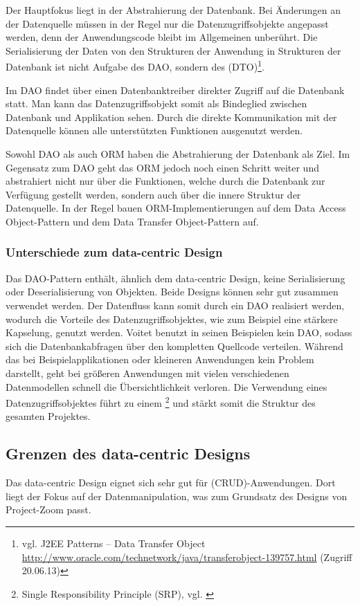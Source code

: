 Der Hauptfokus liegt in der Abstrahierung der Datenbank. Bei Änderungen an der Datenquelle müssen in der Regel nur die Datenzugriffsobjekte angepasst werden, denn der Anwendungscode bleibt im Allgemeinen unberührt. Die Serialisierung der Daten von den Strukturen der Anwendung in Strukturen der Datenbank ist nicht Aufgabe des DAO, sondern des  (DTO)\footnote{vgl. J2EE Patterns – Data Transfer Object \url{http://www.oracle.com/technetwork/java/transferobject-139757.html} (Zugriff 20.06.13)}.

Im DAO findet über einen Datenbanktreiber direkter Zugriff auf die Datenbank statt. Man kann das Datenzugriffsobjekt somit als Bindeglied zwischen Datenbank und Applikation sehen. Durch die direkte Kommunikation mit der Datenquelle können alle unterstützten Funktionen ausgenutzt werden. 

Sowohl DAO als auch ORM haben die Abstrahierung der Datenbank als Ziel. Im Gegensatz zum DAO geht das ORM jedoch noch einen Schritt weiter und abstrahiert nicht nur über die Funktionen, welche durch die Datenbank zur Verfügung gestellt werden, sondern auch über die innere Struktur der Datenquelle. In der Regel bauen ORM-Implementierungen auf dem Data Access Object-Pattern und dem Data Transfer Object-Pattern auf.

\subsubsection{Unterschiede zum data-centric Design}
Das DAO-Pattern enthält, ähnlich dem data-centric Design, keine Serialisierung oder Deserialisierung von Objekten. Beide Designs können sehr gut zusammen verwendet werden. Der Datenfluss kann somit durch ein DAO realisiert werden, wodurch die Vorteile des Datenzugriffsobjektes, wie zum Beispiel eine stärkere Kapselung, genutzt werden. Voitet benutzt in seinen Beispielen kein DAO, sodass sich die Datenbankabfragen über den kompletten Quellcode verteilen. Während das bei Beispielapplikationen oder kleineren Anwendungen kein Problem darstellt, geht bei größeren Anwendungen mit vielen verschiedenen Datenmodellen schnell die Übersichtlichkeit verloren. Die Verwendung eines Datenzugriffsobjektes führt zu einem \footnote{ Single Responsibility Principle (SRP), vgl. \cite[p.~339]{design-patterns}}
 und stärkt somit die Struktur des gesamten Projektes. 

\subsection{Grenzen des data-centric Designs}
Das data-centric Design eignet sich sehr gut für  (CRUD)-Anwendungen. Dort liegt der Fokus auf der Datenmanipulation, was zum Grundsatz des Designs von Project-Zoom passt.

